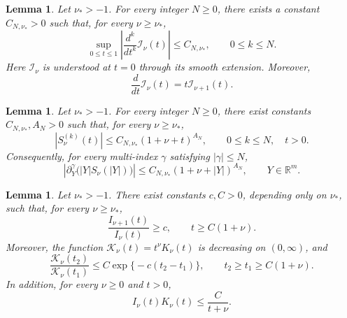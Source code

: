 \documentclass[12pt]{amsart}
\newtheorem{lemma}[theorem]{Lemma}
\begin{document}
\begin{lemma}\label{lem:Bessel_regular_branch}
Let $\nu_*>-1$. For every integer $N\geq 0$, there exists a constant
$C_{N,\nu_*}>0$ such that, for every $\nu\geq\nu_*$,
\begin{equation*}
    \sup_{0\leq t\leq 1}
    \left|
        \frac{d^k}{dt^k}\mathcal I_\nu(t)
    \right|
    \leq C_{N,\nu_*},
    \qquad 0\leq k\leq N.
\end{equation*}
Here $\mathcal I_\nu$ is understood at $t=0$ through its smooth extension. Moreover,
\begin{equation*}
    \frac{d}{dt}\mathcal I_\nu(t)
    =t\mathcal I_{\nu+1}(t).
\end{equation*}
\end{lemma}

\begin{lemma}\label{lem_S_derivative_bound}
Let $\nu_*>-1$. For every integer $N\geq 0$, there exist constants
$C_{N,\nu_*},A_N>0$ such that, for every $\nu\geq\nu_*$,
\begin{equation*}
    \left|S_\nu^{(k)}(t)\right|
    \leq
    C_{N,\nu_*}(1+\nu+t)^{A_N},
    \qquad
    0\leq k\leq N,\quad t>0.
\end{equation*}
Consequently, for every multi-index $\gamma$ satisfying $|\gamma|\leq N$,
\begin{equation*}
    \left|
        \partial_Y^\gamma\bigl(|Y|S_\nu(|Y|)\bigr)
    \right|
    \leq
    C_{N,\nu_*}(1+\nu+|Y|)^{A_N},
    \qquad
    Y\in\mathbb R^m.
\end{equation*}
\end{lemma}

\begin{lemma}\label{lem_bessel_inputs_high_frequency}
Let $\nu_*>-1$. There exist constants $c,C>0$, depending only on $\nu_*$, such that, for every $\nu\geq\nu_*$,
\begin{equation}\label{eq_S_lower_large}
    \frac{I_{\nu+1}(t)}{I_\nu(t)}
    \geq c,
    \qquad
    t\geq C(1+\nu).
\end{equation}
Moreover, the function $\mathcal K_\nu(t)=t^\nu K_\nu(t)$ is decreasing on $(0,\infty)$, and
\begin{equation}\label{eq_K_normalized_exp_decay}
    \frac{\mathcal K_\nu(t_2)}{\mathcal K_\nu(t_1)}
    \leq
    C\exp\bigl\{-c(t_2-t_1)\bigr\},
    \qquad
    t_2\geq t_1\geq C(1+\nu).
\end{equation}
In addition, for every $\nu\geq 0$ and $t>0$,
\begin{equation}\label{eq:product:Bessel}
    I_\nu(t)K_\nu(t)
    \leq
    \frac{C}{t+\nu}.
\end{equation}
\end{lemma}
\end{document}
